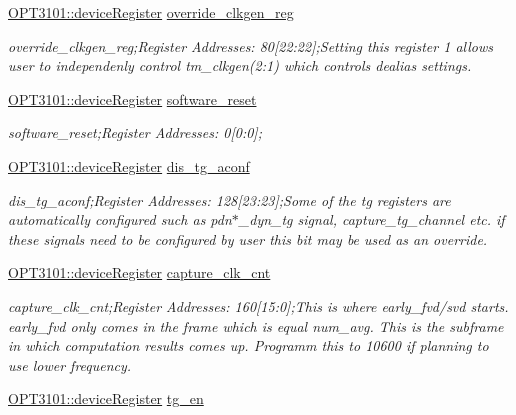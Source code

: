 \begin{DoxyCompactItemize}
\mbox{\hyperlink{class_o_p_t3101_1_1device_register}{O\+P\+T3101\+::device\+Register}} \mbox{\hyperlink{class_o_p_t3101_1_1registers_a74924d92cebb360f0486813366722331}{override\+\_\+clkgen\+\_\+reg}}
\begin{DoxyCompactList}\small\item\em override\+\_\+clkgen\+\_\+reg;Register Addresses\+: 80\mbox{[}22\+:22\mbox{]};Setting this register \textquotesingle{}1\textquotesingle{} allows user to independenly control tm\+\_\+clkgen(2\+:1) which controls dealias settings. \end{DoxyCompactList}\item 
\mbox{\hyperlink{class_o_p_t3101_1_1device_register}{O\+P\+T3101\+::device\+Register}} \mbox{\hyperlink{class_o_p_t3101_1_1registers_a1223651c77a8bcf33f083b0d668f028d}{software\+\_\+reset}}
\begin{DoxyCompactList}\small\item\em software\+\_\+reset;Register Addresses\+: 0\mbox{[}0\+:0\mbox{]}; \end{DoxyCompactList}\item 
\mbox{\hyperlink{class_o_p_t3101_1_1device_register}{O\+P\+T3101\+::device\+Register}} \mbox{\hyperlink{class_o_p_t3101_1_1registers_af37f171c335d8995b3ce666501c18dbe}{dis\+\_\+tg\+\_\+aconf}}
\begin{DoxyCompactList}\small\item\em dis\+\_\+tg\+\_\+aconf;Register Addresses\+: 128\mbox{[}23\+:23\mbox{]};Some of the tg registers are automatically configured such as pdn$\ast$\+\_\+dyn\+\_\+tg signal, capture\+\_\+tg\+\_\+channel etc. if these signals need to be configured by user this bit may be used as an override. \end{DoxyCompactList}\item 
\mbox{\hyperlink{class_o_p_t3101_1_1device_register}{O\+P\+T3101\+::device\+Register}} \mbox{\hyperlink{class_o_p_t3101_1_1registers_a487fb0695a2b670e47f3a5d2a86099fe}{capture\+\_\+clk\+\_\+cnt}}
\begin{DoxyCompactList}\small\item\em capture\+\_\+clk\+\_\+cnt;Register Addresses\+: 160\mbox{[}15\+:0\mbox{]};This is where early\+\_\+fvd/svd starts. early\+\_\+fvd only comes in the frame which is equal num\+\_\+avg. This is the subframe in which computation results comes up. Programm this to 10600 if planning to use lower frequency. \end{DoxyCompactList}\item 
\mbox{\hyperlink{class_o_p_t3101_1_1device_register}{O\+P\+T3101\+::device\+Register}} \mbox{\hyperlink{class_o_p_t3101_1_1registers_a89a7d424e929b98a2ebde2007943a84b}{tg\+\_\+en}}

\end{DoxyCompactItemize}
